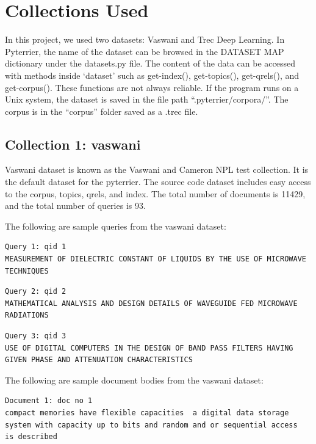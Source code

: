 \documentclass[letterpaper,12pt]{article}
\begin{document}
\section{Collections Used}

In this project, we used two datasets: Vaswani and Trec Deep Learning.
In Pyterrier, the name of the dataset can be browsed in the DATASET MAP dictionary under the datasets.py file.
The content of the data can be accessed with methods inside ‘dataset’ such as get-index(), get-topics(), get-qrels(), and get-corpus(). 
These functions are not always reliable.
If the program runs on a Unix system, the dataset is saved in the file path “.pyterrier/corpora/”. 
The corpus is in the “corpus” folder saved as a .trec file.


\subsection{Collection 1: vaswani}
Vaswani dataset is known as the Vaswani and Cameron NPL test collection.
It is the default dataset for the pyterrier. The source code dataset includes easy access to the corpus, topics, qrels, and index. 
The total number of documents is 11429, and the total number of queries is 93. 

The following are sample queries from the vaswani dataset:

\begin{lstlisting}[frame=single]  
Query 1: qid 1
MEASUREMENT OF DIELECTRIC CONSTANT OF LIQUIDS BY THE USE OF MICROWAVE TECHNIQUES
\end{lstlisting}

\begin{lstlisting}[frame=single]  
Query 2: qid 2
MATHEMATICAL ANALYSIS AND DESIGN DETAILS OF WAVEGUIDE FED MICROWAVE RADIATIONS
\end{lstlisting}

\begin{lstlisting}[frame=single]  
Query 3: qid 3
USE OF DIGITAL COMPUTERS IN THE DESIGN OF BAND PASS FILTERS HAVING GIVEN PHASE AND ATTENUATION CHARACTERISTICS
\end{lstlisting}

The following are sample document bodies from the vaswani dataset:

\begin{lstlisting}[frame=single]  
Document 1: doc no 1
compact memories have flexible capacities  a digital data storage
system with capacity up to bits and random and or sequential access
is described
\end{lstlisting}
\end{document}
